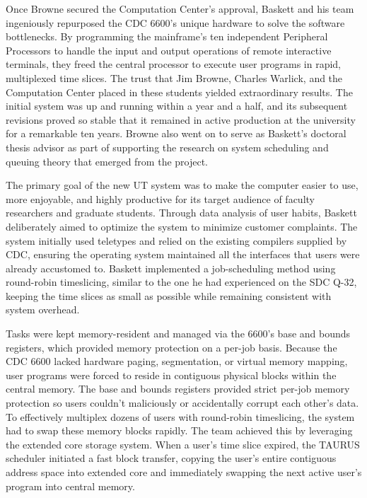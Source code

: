 Once Browne secured the Computation Center's approval, Baskett and his team ingeniously repurposed the CDC 6600's unique hardware to solve the software bottlenecks. By programming the mainframe's ten independent Peripheral Processors to handle the input and output operations of remote interactive terminals, they freed the central processor to execute user programs in rapid, multiplexed time slices. The trust that Jim Browne, Charles Warlick, and the Computation Center placed in these students yielded extraordinary results. The initial system was up and running within a year and a half, and its subsequent revisions proved so stable that it remained in active production at the university for a remarkable ten years. Browne also went on to serve as Baskett's doctoral thesis advisor as part of supporting the research on system scheduling and queuing theory that emerged from the project.

The primary goal of the new UT system was to make the computer easier to use, more enjoyable, and highly productive for its target audience of faculty researchers and graduate students. Through data analysis of user habits, Baskett deliberately aimed to optimize the system to minimize customer complaints. The system initially used teletypes and relied on the existing compilers supplied by CDC, ensuring the operating system maintained all the interfaces that users were already accustomed to. Baskett implemented a job-scheduling method using round-robin timeslicing, similar to the one he had experienced on the SDC Q-32, keeping the time slices as small as possible while remaining consistent with system overhead. 

Tasks were kept memory-resident and managed via the 6600's base and bounds registers, which provided memory protection on a per-job basis. Because the CDC 6600 lacked hardware paging, segmentation, or virtual memory mapping, user programs were forced to reside in contiguous physical blocks within the central memory. The base and bounds registers provided strict per-job memory protection so users couldn't maliciously or accidentally corrupt each other's data. To effectively multiplex dozens of users with round-robin timeslicing, the system had to swap these memory blocks rapidly. The team achieved this by leveraging the extended core storage system. When a user's time slice expired, the TAURUS scheduler initiated a fast block transfer, copying the user's entire contiguous address space into extended core and immediately swapping the next active user's program into central memory.


